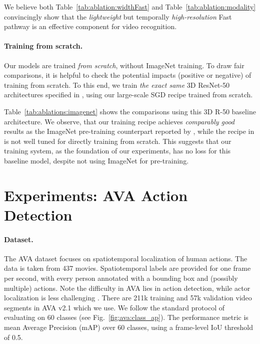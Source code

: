 \documentclass[10pt,twocolumn,letterpaper]{article}
\newcommand{\figref}[1]{Fig.~\ref{#1}}
\newcommand{\tblref}[1]{Table~\ref{#1}}
\begin{document}
	We believe both \tblref{tab:ablation:widthFast} and \tblref{tab:ablation:modality} convincingly show that the \emph{lightweight} but temporally \emph{high-resolution} Fast pathway is an effective component for video recognition.
	
	
	\paragraph{Training from scratch.} Our models are trained \emph{from scratch}, without ImageNet training. To draw fair comparisons, it is helpful to check the potential impacts (positive or negative) of training from scratch. To this end, we train \emph{the exact same} 3D ResNet-50 architectures specified in \cite{Wang2018}, using our large-scale SGD recipe trained from scratch.
	
	\tblref{tab:ablations:imagenet} shows the comparisons using this 3D R-50 baseline architecture. We observe, that our training recipe achieves \emph{comparably good} results as the ImageNet pre-training counterpart reported by \cite{Wang2018}, while the recipe in \cite{Wang2018} is not well tuned for directly training from scratch. This suggests that our training system, as the foundation of our experiments, has no loss for this baseline model, despite not using ImageNet for pre-training.

	
	\section{Experiments: AVA Action Detection}\label{sec:detection}
	
	\paragraph{Dataset.}
	The AVA dataset \cite{Gu2018} focuses on spatiotemporal localization of human actions.
	The data is taken from 437 movies. Spatiotemporal labels are provided for one frame per second, with every person annotated with a bounding box and (possibly multiple) actions. Note the difficulty in AVA lies in action detection, while actor localization is less challenging \cite{Gu2018}. 
	There are 211k training and 57k validation video segments in AVA v2.1 which we use. We follow the standard protocol  \cite{Gu2018} of evaluating on 60 classes (see \figref{fig:ava:class_ap}).
	The performance metric is mean Average Precision (mAP) over 60 classes, using a frame-level IoU threshold of 0.5. 
	
\end{document}
